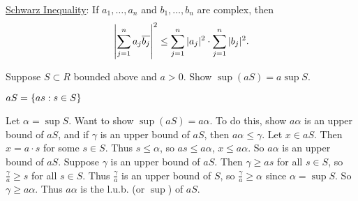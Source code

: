 \documentclass[]{article}
\begin{document}
\ul{Schwarz Inequality}: If $a_1,\dots,a_n$ and $b_1,\dots,b_n$ are complex, then
$$ \left|\sum_{j=1}^n a_j\overline{b_j}\right|^2 \leq \sum_{j=1}^n|a_j|^2\cdot\sum_{j=1}^n|b_j|^2.$$

\begin{example}
	[HW] Suppose $S\subset R$ bounded above and $a>0$. Show $\sup(aS)=a\sup S$.
	\begin{recall}
		$aS = \left\{ as : s\in S \right\}$
	\end{recall}
	Let $\alpha = \sup S$. Want to show $\sup(aS)=a\alpha$. To do this, show $a\alpha$ is an upper bound of $aS$, and if $\gamma$ is an upper bound of $aS$, then $a\alpha\leq\gamma$.
	Let $x\in aS$. Then $x=a\cdot s$ for some $s\in S$. Thus $s\leq\alpha$, so $as\leq a\alpha$, $x\leq a\alpha$.
	So $a\alpha$ is an upper bound of $aS$. Suppose $\gamma$ is an upper bound of $aS$.
	Then $\gamma\geq as$ for all $s\in S$, so $\frac\gamma a\geq s$ for all $s\in S$.
	Thus $\frac\gamma a$ is an upper bound of $S$, so $\frac\gamma a\geq\alpha$ since $\alpha=\sup S$. So $\gamma\geq a\alpha$. Thus $a\alpha$ is the l.u.b. (or $\sup$) of $aS$.
\end{example}
\end{document}
